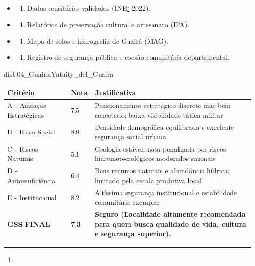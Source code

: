 {\begin{itemize}
\tightlist
\item
  \begin{enumerate}
  \def\labelenumi{\arabic{enumi})}
  \tightlist
  \item
    Dados censitários validados (INE\footnote{\fineINE} 2022).
  \end{enumerate}
\item
  \begin{enumerate}
  \def\labelenumi{\arabic{enumi})}
  \setcounter{enumi}{1}
  \tightlist
  \item
    Relatórios de preservação cultural e artesanato (IPA).
  \end{enumerate}
\item
  \begin{enumerate}
  \def\labelenumi{\arabic{enumi})}
  \setcounter{enumi}{2}
  \tightlist
  \item
    Mapa de solos e hidrografia de Guairá (MAG).
  \end{enumerate}
\item
  \begin{enumerate}
  \def\labelenumi{\arabic{enumi})}
  \setcounter{enumi}{3}
  \tightlist
  \item
    Registro de segurança pública e coesão comunitária departamental.
  \end{enumerate}
\end{itemize}}{dist:04_Guaira:Yataity_del_Guaira}
\begin{table}[ht!]
\small \begin{tabular}{p{3.0cm}p{0.8cm}p{6.0cm}} \toprule
\textbf{Critério} & \textbf{Nota} & \textbf{Justificativa} \\ \midrule
A - Ameaças Estratégicas & 7.5 & Posicionamento estratégico discreto mas bem conectado; baixa visibilidade tática militar \\
B - Risco Social & 8.9 & Densidade demográfica equilibrada e excelente segurança social urbana \\
C - Riscos Naturais & 5.1 & Geologia estável; nota penalizada por riscos hidrometeorológicos moderados sazonais \\
D - Autossuficiência & 6.4 & Bons recursos naturais e abundância hídrica; limitado pela escala produtiva local \\
E - Institucional & 8.2 & Altíssima segurança institucional e estabilidade comunitária exemplar \\
\midrule \textbf{GSS FINAL} & \textbf{7.3} & \textbf{Seguro (Localidade altamente recomendada para quem busca qualidade de vida, cultura e segurança superior).} \\ \bottomrule \end{tabular}
\end{table}
